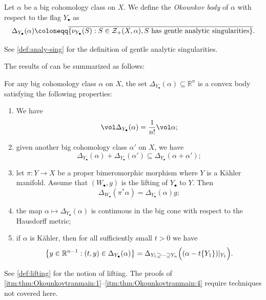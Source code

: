 \begin{definition}\label{def:tradOk}
Let $\alpha$ be a big cohomology class on $X$. We define the \emph{Okounkov body} of $\alpha$ with respect to the flag $Y_{\bullet}$ as
    \begin{equation}\label{eq:twodefspob}
        \Delta_{Y_{\bullet}}(\alpha)\coloneqq \overline{\left\{\nu_{Y_{\bullet}}(S): S\in \mathcal{Z}_+(X,\alpha),S\textup{ has gentle analytic singularities} \right\}}.
    \end{equation}
\end{definition}
See \cref{def:analy-sing} for the definition of gentle analytic singularities.

The results of \cite{DRWNXZ} can be summarized as follows:
\begin{theorem}\label{thm:Okounkovtranmain}
    For any big cohomology class $\alpha$ on $X$, the set $\Delta_{Y_{\bullet}}(\alpha)\subseteq \mathbb{R}^n$ is a convex body satisfying the following properties:
    \begin{enumerate}
        \item\label{itm:thm:Okounkovtranmain:1} We have
        \[
        \vol \Delta_{Y_{\bullet}}(\alpha)=\frac{1}{n!}\vol \alpha;
        \]
        \item\label{itm:thm:Okounkovtranmain:2} given another big cohomology class $\alpha'$ on $X$, we have
        \[
        \Delta_{Y_{\bullet}}(\alpha)+\Delta_{Y_{\bullet}}(\alpha')\subseteq \Delta_{Y_{\bullet}}(\alpha+\alpha');
        \]
        \item\label{itm:thm:Okounkovtranmain:3} let $\pi\colon Y\rightarrow X$ be a proper bimeromorphic morphism where $Y$ is a Kähler manifold. Assume that $(W_{\bullet},g)$ is the lifting of $Y_{\bullet}$ to $Y$. Then
        \[
        \Delta_{W_{\bullet}}(\pi^*\alpha)=\Delta_{Y_{\bullet}}(\alpha)g;
        \]
        \item\label{itm:thm:Okounkovtranmain:4} the map $\alpha\mapsto \Delta_{Y_{\bullet}}(\alpha)$ is continuous in the big cone with respect to the Hausdorff metric;
        \item\label{itm:thm:Okounkovtranmain:5} if $\alpha$ is Kähler, then for all sufficiently small $t>0$ we have
        \[
            \left\{ y\in \mathbb{R}^{n-1}: (t,y)\in \Delta_{Y_{\bullet}}(\alpha) \right\}=\Delta_{Y_1\supseteq \cdots \supseteq Y_n}\Bigl((\alpha-t\{Y_1\})|_{Y_1}\Bigr).
        \]
    \end{enumerate}
\end{theorem}
See \cref{def:lifting} for the notion of lifting. The proofs of \ref{itm:thm:Okounkovtranmain:1}--\ref{itm:thm:Okounkovtranmain:4} require techniques not covered here.

